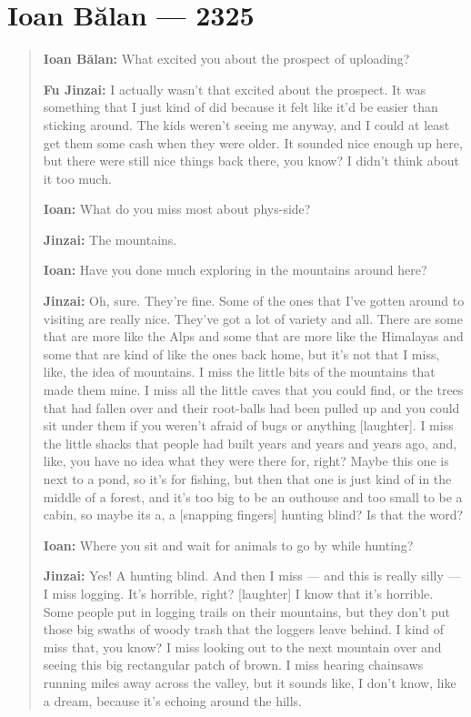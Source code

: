 \hypertarget{ioan-bux103lan-2325}{%
\chapter{Ioan Bălan — 2325}\label{ioan-bux103lan-2325}}

\begin{quote}
\textbf{Ioan Bălan:} What excited you about the prospect of uploading?

\textbf{Fu Jinzai:} I actually wasn't that excited about the prospect. It was something that I just kind of did because it felt like it'd be easier than sticking around. The kids weren't seeing me anyway, and I could at least get them some cash when they were older. It sounded nice enough up here, but there were still nice things back there, you know? I didn't think about it too much.

\textbf{Ioan:} What do you miss most about phys-side?

\textbf{Jinzai:} The mountains.

\textbf{Ioan:} Have you done much exploring in the mountains around here?

\textbf{Jinzai:} Oh, sure. They're fine. Some of the ones that I've gotten around to visiting are really nice. They've got a lot of variety and all. There are some that are more like the Alps and some that are more like the Himalayas and some that are kind of like the ones back home, but it's not that I miss, like, the idea of mountains. I miss the little bits of the mountains that made them mine. I miss all the little caves that you could find, or the trees that had fallen over and their root-balls had been pulled up and you could sit under them if you weren't afraid of bugs or anything {[}laughter{]}. I miss the little shacks that people had built years and years and years ago, and, like, you have no idea what they were there for, right? Maybe this one is next to a pond, so it's for fishing, but then that one is just kind of in the middle of a forest, and it's too big to be an outhouse and too small to be a cabin, so maybe its a, a {[}snapping fingers{]} hunting blind? Is that the word?

\textbf{Ioan:} Where you sit and wait for animals to go by while hunting?

\textbf{Jinzai:} Yes! A hunting blind. And then I miss — and this is really silly — I miss logging. It's horrible, right? {[}laughter{]} I know that it's horrible. Some people put in logging trails on their mountains, but they don't put those big swaths of woody trash that the loggers leave behind. I kind of miss that, you know? I miss looking out to the next mountain over and seeing this big rectangular patch of brown. I miss hearing chainsaws running miles away across the valley, but it sounds like, I don't know, like a dream, because it's echoing around the hills.


\end{quote}
